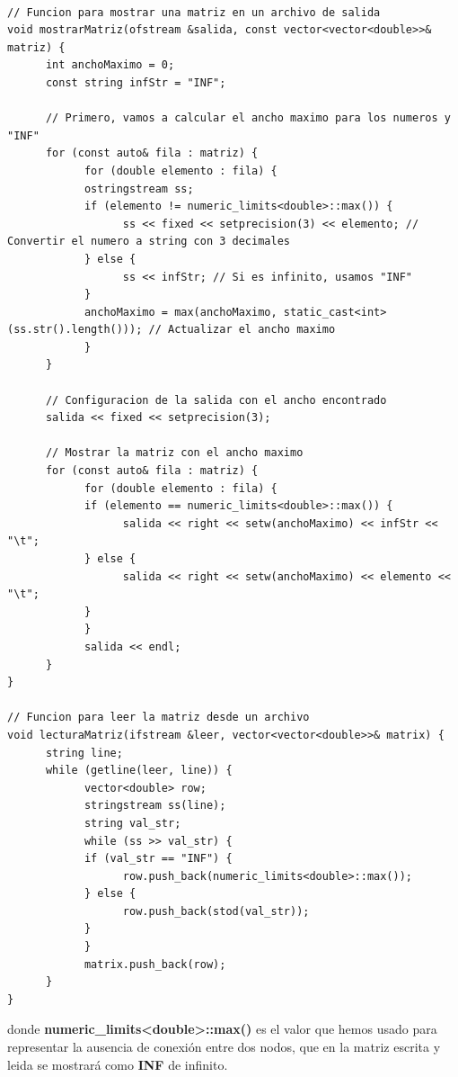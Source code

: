 \documentclass[11pt,openany]{book}
\begin{document}
\begin{lstlisting}

// Funcion para mostrar una matriz en un archivo de salida
void mostrarMatriz(ofstream &salida, const vector<vector<double>>& matriz) {
      int anchoMaximo = 0;
      const string infStr = "INF";

      // Primero, vamos a calcular el ancho maximo para los numeros y "INF"
      for (const auto& fila : matriz) {
            for (double elemento : fila) {
            ostringstream ss;
            if (elemento != numeric_limits<double>::max()) {
                  ss << fixed << setprecision(3) << elemento; // Convertir el numero a string con 3 decimales
            } else {
                  ss << infStr; // Si es infinito, usamos "INF"
            }
            anchoMaximo = max(anchoMaximo, static_cast<int>(ss.str().length())); // Actualizar el ancho maximo
            }
      }

      // Configuracion de la salida con el ancho encontrado
      salida << fixed << setprecision(3);

      // Mostrar la matriz con el ancho maximo
      for (const auto& fila : matriz) {
            for (double elemento : fila) {
            if (elemento == numeric_limits<double>::max()) {
                  salida << right << setw(anchoMaximo) << infStr << "\t";
            } else {
                  salida << right << setw(anchoMaximo) << elemento << "\t";
            }
            }
            salida << endl;
      }
}
      
// Funcion para leer la matriz desde un archivo
void lecturaMatriz(ifstream &leer, vector<vector<double>>& matrix) {
      string line;
      while (getline(leer, line)) {
            vector<double> row;
            stringstream ss(line);
            string val_str;
            while (ss >> val_str) {
            if (val_str == "INF") {
                  row.push_back(numeric_limits<double>::max());
            } else {
                  row.push_back(stod(val_str));
            }
            }
            matrix.push_back(row);
      }
}
\end{lstlisting}
donde \textbf{numeric\_limits<double>::max()} es el valor que hemos usado para representar la ausencia de conexión entre dos nodos, que
en la matriz escrita y leida se mostrará como \textbf{INF} de infinito.\\ \\
\end{document}
